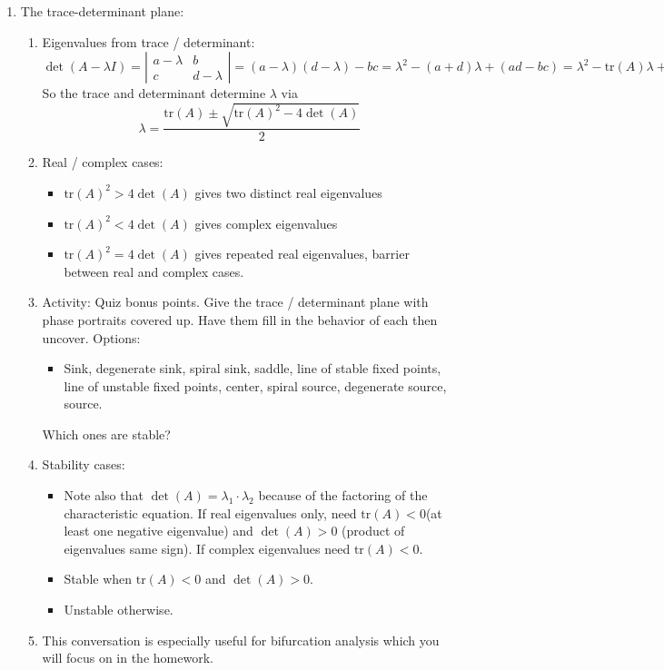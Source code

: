 \documentclass{article}
\begin{document}
\begin{enumerate}
\item The trace-determinant plane:
\begin{enumerate}
\item Eigenvalues from trace / determinant:
\[
\det(A-\lambda I) = 
\left| 
\begin{array}{cc}
a-\lambda & b \\
c & d-\lambda
\end{array}
\right| = (a-\lambda)(d-\lambda)-bc = \lambda^2-(a+d)\lambda +(ad-bc) = \lambda^2 - \text{tr}(A)\lambda + \det(A) = 0
\]
So the trace and determinant determine $\lambda $ via
\[
\lambda = \frac{\text{tr}(A) \pm \sqrt{\text{tr}(A)^2-4\det(A)}}{2}
\]
\item Real / complex cases:
\begin{itemize}
\item $\text{tr}(A)^2>4\det(A)$ gives two distinct real eigenvalues
\item $\text{tr}(A)^2<4\det(A)$ gives complex eigenvalues
\item $\text{tr}(A)^2=4\det(A)$ gives repeated real eigenvalues, barrier between real and complex cases.
\end{itemize}
\item Activity: Quiz bonus points. Give the trace / determinant plane with phase portraits covered up. Have them fill in the behavior of each then uncover. Options:
\begin{itemize}
\item Sink, degenerate sink, spiral sink, saddle, line of stable fixed points, line of unstable fixed points, center, spiral source, degenerate source, source.
\end{itemize}
Which ones are stable?
\item Stability cases:
\begin{itemize}
\item Note also that $\det(A)=\lambda_1 \cdot \lambda_2$ because of the factoring of the characteristic equation. If real eigenvalues only, need $\text{tr}(A)<0$(at least one negative eigenvalue) and $\det(A)>0$ (product of eigenvalues same sign). If complex eigenvalues need $\text{tr}(A)<0$. 
\item Stable when $\text{tr}(A)<0$ and $\det(A)>0$.
\item Unstable otherwise.
\end{itemize}
\item This conversation is especially useful for bifurcation analysis which you will focus on in the homework.
\end{enumerate}


\end{enumerate}
\end{document}
